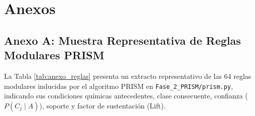 \documentclass{article}
\begin{document}

\section{Anexos}

\subsection{Anexo A: Muestra Representativa de Reglas Modulares PRISM}

La Tabla \ref{tab:anexo_reglas} presenta un extracto representativo de las 64 reglas modulares inducidas por el algoritmo PRISM en \texttt{Fase\_2\_PRISM/prism.py}, indicando sus condiciones químicas antecedentes, clase consecuente, confianza ($P(C_j \mid A)$), soporte y factor de sustentación ($\text{Lift}$).
\end{document}
